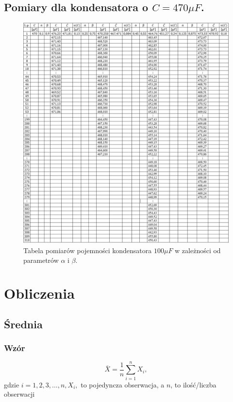 \documentclass[12pt]{mwart}
\begin{document}
	\subsection{Pomiary dla kondensatora o $C=470\mu F$.}
	\begin{figure}[H]
		\centering
		\includegraphics[width=1\linewidth, height=.93\textheight]{470_tab.jpg}
		\caption{Tabela pomiarów pojemności kondensatora $100\mu F$ w zależności od parametrów $\alpha$ i $\beta$.}
	\end{figure}
	\section{Obliczenia}
	\subsection{Średnia}
	\subsubsection{Wzór}
	\begin{equation}
		\bar X = \frac{1}{n}\sum\limits_{i=1}^{n} X_{i},
	\end{equation}
	gdzie $i=1,2,3,\dots ,n, X_{i},$ to pojedyncza obserwacja, a $n$, to ilość/liczba obserwacji
\end{document}
